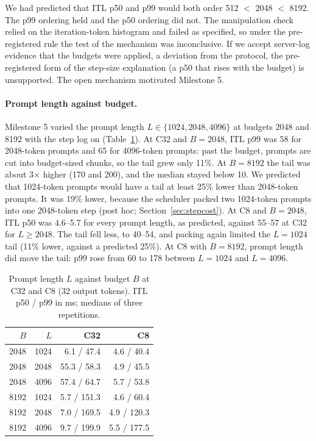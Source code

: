 We had predicted that ITL p50 and p99 would both order 512 $<$ 2048 $<$ 8192. The
p99 ordering held and the p50 ordering did not. The manipulation check relied on the
iteration-token histogram and failed as specified, so under the pre-registered rule the
test of the mechanism was inconclusive. If we accept server-log evidence that the
budgets were applied, a deviation from the protocol, the pre-registered form of the
step-size explanation (a p50 that rises with the budget) is unsupported. The open
mechanism motivated Milestone 5.

\paragraph{Prompt length against budget.}
Milestone 5 varied the prompt length $L \in \{1024, 2048, 4096\}$ at budgets 2048 and
8192 with the step log on (Table~\ref{tab:lengths}). At C32
and $B{=}2048$, ITL p99 was 58\ms{} for 2048-token prompts and 65\ms{} for 4096-token
prompts: past the budget, prompts are cut into budget-sized chunks, so the tail grew
only 11\%. At $B{=}8192$ the tail was about 3$\times$ higher (170 and 200\ms), and the
median stayed below 10\ms. We predicted that 1024-token prompts would have a tail at
least 25\% lower than 2048-token prompts. It was 19\% lower, because the scheduler
packed two 1024-token prompts into one 2048-token step (post hoc;
Section~\ref{sec:stepcost}). At C8 and $B{=}2048$, ITL p50 was 4.6--5.7\ms{} for every
prompt length, as predicted, against 55--57\ms{} at C32 for $L \ge 2048$. The tail fell
less, to 40--54\ms, and packing again limited the $L{=}1024$ tail (11\% lower, against
a predicted 25\%). At C8 with $B{=}8192$, prompt length did move the tail: p99 rose
from 60 to 178\ms{} between $L{=}1024$ and $L{=}4096$.

\begin{table}[t]
  \centering
  \caption{Prompt length $L$ against budget $B$ at C32 and C8 (32 output tokens).
    ITL p50 / p99 in ms; medians of three repetitions.}
  \label{tab:lengths}
  \begin{tabular}{rrrr}
    \toprule
    $B$ & $L$ & C32 & C8 \\
    \midrule
    2048 & 1024 & 6.1 / 47.4  & 4.6 / 40.4 \\
    2048 & 2048 & 55.3 / 58.3 & 4.9 / 45.5 \\
    2048 & 4096 & 57.4 / 64.7 & 5.7 / 53.8 \\
    8192 & 1024 & 5.7 / 151.3 & 4.6 / 60.4 \\
    8192 & 2048 & 7.0 / 169.5 & 4.9 / 120.3 \\
    8192 & 4096 & 9.7 / 199.9 & 5.5 / 177.5 \\
    \bottomrule
  \end{tabular}
\end{table}
